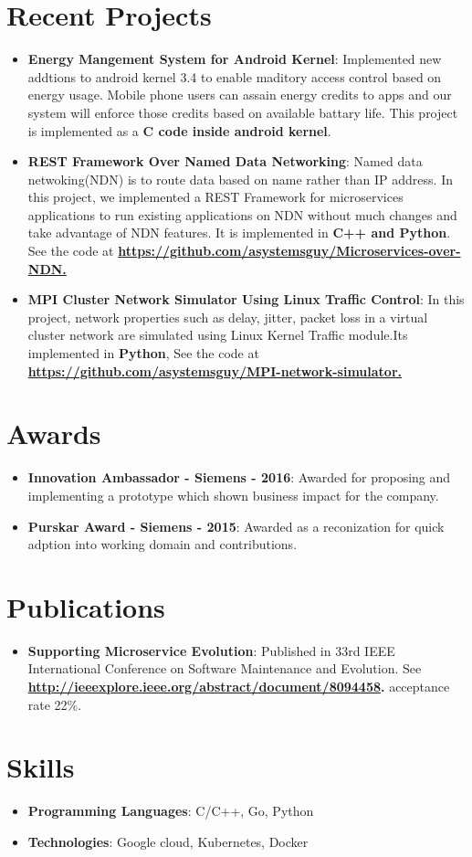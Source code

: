 \documentclass[letterpaper,11pt]{article}
\newcommand{\resumeItem}[2]{
  \item\small{
    \textbf{#1}{: #2 \vspace{-2pt}}
  }
}
\newcommand{\resumeSubItem}[2]{\resumeItem{#1}{#2}\vspace{-4pt}}
\newcommand{\resumeSubHeadingListStart}{\begin{itemize}[leftmargin=*]}
\newcommand{\resumeSubHeadingListEnd}{\end{itemize}}
\begin{document}
\section{Recent Projects}
  \resumeSubHeadingListStart
    \resumeSubItem{Energy Mangement System for Android Kernel}
      {Implemented new addtions to android kernel 3.4 to enable maditory access control based on energy usage. Mobile phone users can assain energy credits to apps and our system will enforce those credits based on available battary life. This project is implemented as a \textbf{C code inside android kernel}.}
    \resumeSubItem{REST Framework Over Named Data Networking}
      {Named data netwoking(NDN) is to route data based on name rather than IP address. In this project, we implemented a REST Framework for microservices applications to run existing applications on NDN without much changes and take advantage of NDN features. It is implemented in \textbf{C++ and Python}. See the code at \textbf{\href{https://github.com/asystemsguy/Microservices-over-NDN}{https://github.com/asystemsguy/Microservices-over-NDN.}}
      }
    \resumeSubItem{MPI Cluster Network Simulator Using Linux Traffic Control}
      {In this project, network properties such as delay, jitter, packet loss in a virtual cluster network are simulated using Linux Kernel Traffic module.Its implemented in \textbf{Python}, See the code at \textbf{\href{ https://github.com/asystemsguy/MPI-network-simulator}{https://github.com/asystemsguy/MPI-network-simulator.}}}
 \resumeSubHeadingListEnd

\section{Awards}
  \resumeSubHeadingListStart
    \resumeSubItem{Innovation Ambassador - Siemens - 2016}
      {Awarded for proposing and implementing a prototype which shown business impact for the company.}
    \resumeSubItem{Purskar Award - Siemens - 2015}
      {Awarded as a reconization for quick adption into working domain and contributions.}
  \resumeSubHeadingListEnd

\section{Publications}
  \resumeSubHeadingListStart
    \resumeSubItem {Supporting Microservice Evolution} {Published in 33rd IEEE International Conference on Software Maintenance and Evolution. See \textbf{\href{http://ieeexplore.ieee.org/abstract/document/8094458}{http://ieeexplore.ieee.org/abstract/document/8094458}.} acceptance rate 22\%.
    }
  \resumeSubHeadingListEnd
\section{Skills}
  \resumeSubHeadingListStart
    \item{
      \textbf{Programming Languages}{: C/C++, Go, Python }
      \hfill
      }
    \item{
    \textbf{Technologies}{: Google cloud, Kubernetes, Docker}
    }
 \resumeSubHeadingListEnd


\end{document}

